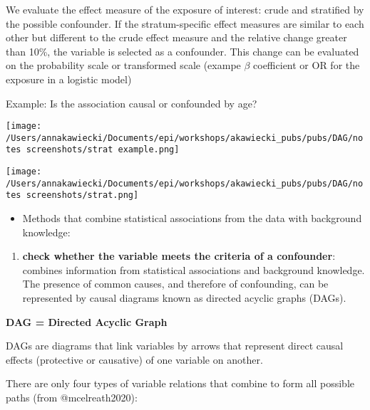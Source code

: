 \documentclass[
]{article}
\providecommand{\tightlist}{%
  \setlength{\itemsep}{0pt}\setlength{\parskip}{0pt}}
\begin{document}
We evaluate the effect measure of the exposure of interest: crude and
stratified by the possible confounder. If the stratum-specific effect
measures are similar to each other but different to the crude effect
measure and the relative change greater than 10\%, the variable is
selected as a confounder. This change can be evaluated on the
probability scale or transformed scale (exampe \(\beta\) coefficient or
OR for the exposure in a logistic model)

Example: Is the association causal or confounded by age?

\texttt{[image: /Users/annakawiecki/Documents/epi/workshops/akawiecki\_pubs/pubs/DAG/notes screenshots/strat example.png]}

\texttt{[image: /Users/annakawiecki/Documents/epi/workshops/akawiecki\_pubs/pubs/DAG/notes screenshots/strat.png]}

\begin{itemize}
\tightlist
\item
  Methods that combine statistical associations from the data with
  background knowledge:
\end{itemize}

\begin{enumerate}
\def\labelenumi{\arabic{enumi}.}
\setcounter{enumi}{2}
\tightlist
\item
  \textbf{check whether the variable meets the criteria of a
  confounder}: combines information from statistical associations and
  background knowledge. The presence of common causes, and therefore of
  confounding, can be represented by causal diagrams known as directed
  acyclic graphs (DAGs).
\end{enumerate}

\textbf{DAG = Directed Acyclic Graph}

DAGs are diagrams that link variables by arrows that represent direct
causal effects (protective or causative) of one variable on another.

There are only four types of variable relations that combine to form all
possible paths (from @mcelreath2020):
\end{document}
